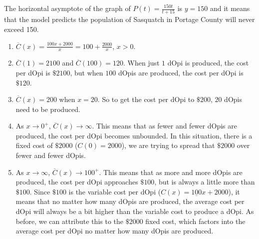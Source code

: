 \begin{exenum}
\begin{enumerate}
\end{enumerate}

\item The horizontal asymptote of the graph of $P(t) = \frac{150t}{t + 15}$ is $y = 150$ and it means that the model predicts the population of Sasquatch in Portage County will never exceed 150.

\item  \begin{enumerate}

\item $\overline{C}(x) = \frac{100x+2000}{x} = 100 + \frac{2000}{x}$, $x > 0$.

\item  $\overline{C}(1) = 2100$ and $\overline{C}(100) = 120$. When just $1$ dOpi is produced, the cost per dOpi is $\$2100$, but when $100$ dOpis are produced, the cost per dOpi is $\$120$.

\item  $\overline{C}(x) = 200$ when $x = 20$.  So to get the cost per dOpi to $\$200$, $20$ dOpis need to be produced.

\item  As $x \rightarrow 0^{+}$, $\overline{C}(x) \rightarrow \infty$.  This means that as fewer and fewer dOpis are produced, the cost per dOpi becomes unbounded.  In this situation, there is a fixed cost of $\$2000$ ($C(0) = 2000$), we are trying to spread that $\$2000$ over fewer and fewer dOpis.

\item   As $x \rightarrow \infty$,  $\overline{C}(x) \rightarrow 100^{+}$.  This means that as more and more dOpis are produced, the cost per dOpi approaches $\$100$, but is always a little more than $\$100$.  Since $\$100$ is the variable cost per dOpi ($C(x) = \underline{100}x+2000$), it means that no matter how many dOpis are produced, the average cost per dOpi will always be a bit higher than the variable cost to produce a dOpi.  As before, we can attribute this to the $\$2000$ fixed cost, which factors into the average cost per dOpi no matter how many dOpis are produced.

\end{enumerate}

\item  \begin{enumerate}


\end{enumerate}
\end{exenum}
